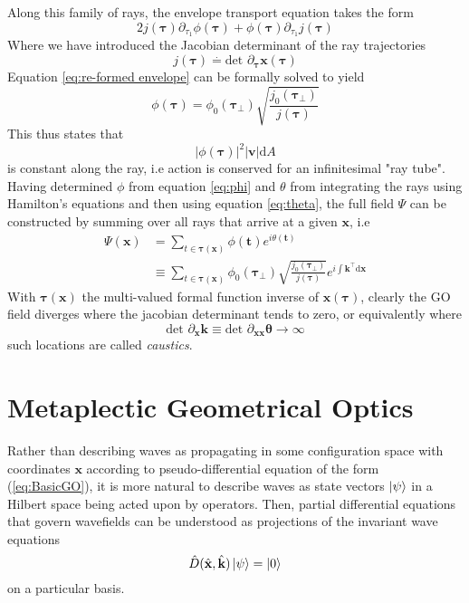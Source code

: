 \documentclass{article}
\begin{document}
Along this family of rays, the envelope transport equation takes the form
\begin{equation}
    \label{eq:re-formed envelope}
    2j(\mathbf{\tau})\partial_{\tau_1}\phi(\mathbf{\tau}) + \phi(\mathbf{\tau})\partial_{\tau_1}j(\mathbf{\tau}) 
\end{equation}
Where we have introduced the Jacobian determinant of the ray trajectories
\begin{equation}
    j(\mathbf{\tau}) \stackrel{.}{=} \text{det  } \partial_{\mathbf{\tau}} \mathbf{x}(\mathbf{\tau})
\end{equation}
Equation \ref{eq:re-formed envelope} can be formally solved to yield
\begin{equation}
    \label{eq:phi}
    \phi(\mathbf{\tau}) = \phi_0(\mathbf{\tau}_\perp)\sqrt{\frac{ j_0(\mathbf{\tau_\perp}) }{ j(\mathbf{\tau}) }}
\end{equation}
This thus states that
\begin{equation}
    |\phi(\mathbf{\tau})|^2|\mathbf{v}|\text{d}A
\end{equation}
is constant along the ray, i.e action is conserved for an infinitesimal "ray
tube".  Having determined $\phi$ from equation \ref{eq:phi} and $\theta$ from
integrating the rays using Hamilton's equations and then using equation
\ref{eq:theta}, the full field $\Psi$ can be constructed by summing over all rays 
that arrive at a given $\mathbf{x}$, i.e
\begin{eqnarray}
    \Psi(\mathbf{x}) &= \sum_{t \in \mathbf{\tau}(\mathbf{x})} \phi(\mathbf{t}) e^{i\theta(\mathbf{t})} \\
                     &\equiv \sum_{t \in \mathbf{\tau}(\mathbf{x})}\phi_0(\mathbf{\tau}_\perp)\sqrt{\frac{ j_0(\mathbf{\tau_\perp}) }{ j(\mathbf{\tau}) }} e^{i\int \mathbf{k}^\intercal \text{d}\mathbf{x}}
\end{eqnarray}
With $\mathbf{\tau}(\mathbf{x})$ the multi-valued formal function inverse of $\mathbf{x}(\mathbf{\tau})$, clearly
the GO field diverges where the jacobian determinant tends to zero,
or equivalently where
\begin{equation}
    \text{det  } \partial_{\mathbf{\mathbf{x}}} \mathbf{k} \equiv \text{det  } \partial_{\mathbf{\mathbf{x}}\mathbf{x}} \mathbf{\theta}  \rightarrow \infty
\end{equation}
such locations are called \textit{caustics}.
\section{Metaplectic Geometrical Optics}
Rather than describing waves as propagating in some
configuration space with coordinates $\mathbf{x}$ according to
pseudo-differential equation of the form (\ref{eq:BasicGO}), it
is more natural to describe waves as state vectors $\ket{\psi}$
in a Hilbert space being acted upon by operators. Then, partial
differential equations that govern wavefields can be understood
as projections of the invariant wave equations 
\begin{equation}
    \hat{D}(\hat{\mathbf{x}},\hat{\mathbf{k}})\ket{\psi} = \ket{0}
\end{equation}
on a particular basis.
\end{document}
